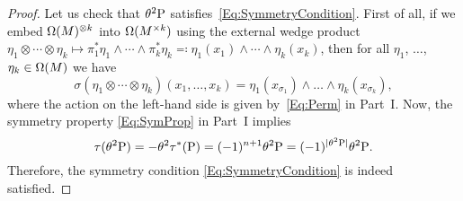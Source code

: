\documentclass[\MainFolder/Text.tex]{subfiles}
\begin{document}
\begin{proof}
Let us check that $\theta^{2}\mathrm{P}$ satisfies~\eqref{Eq:SymmetryCondition}. First of all, if we embed $\Omega(M)^{\otimes k}$ into $\Omega(M^{\times k})$ using the external wedge product $\eta_1 \otimes \dotsb \otimes \eta_k \mapsto \pi_1^*\eta_1 \wedge \dotsm \wedge \pi_k^* \eta_k \eqqcolon \eta_1(x_1)\wedge \dotsm \wedge \eta_k(x_k)$, then for all $\eta_1$, $\dotsc$, $\eta_k \in \Omega(M)$ we have
$$\sigma(\eta_1 \otimes \dotsb \otimes \eta_k)(x_1,\dotsc,x_k) = \eta_1(x_{\sigma_1})\wedge \dotsc \wedge \eta_k(x_{\sigma_k}), $$
where the action on the left-hand side is given by~\eqref{Eq:Perm} in Part~I. Now, the symmetry property \eqref{Eq:SymProp} in Part~I implies
$$ \tau(\theta^{2}\mathrm{P}) = - \theta^{2}\tau^*(\mathrm{P}) = (-1)^{n+1} \theta^{2} \mathrm{P} = (-1)^{|\theta^2 \mathrm{P}|} \theta^2 \mathrm{P}. $$
Therefore, the symmetry condition \eqref{Eq:SymmetryCondition} is indeed satisfied.


\end{proof}
\end{document}
